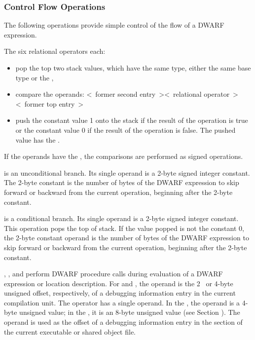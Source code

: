 \subsubsection{Control Flow Operations}
\label{chap:controlflowoperations}
The 
following operations provide simple control of the flow of a DWARF expression.
\begin{enumerate}[1. ]
\itembfnl{\DWOPleTARG, \DWOPgeTARG, \DWOPeqTARG, \DWOPltTARG, \DWOPgtTARG, \DWOPneTARG}
The six relational operators each:
\begin{itemize}
\item pop the top two stack values, which have the same type,
either the same base type or the \generictype, 

\item compare the operands:
\linebreak
\textless~former second entry~\textgreater  \textless~relational operator~\textgreater \textless~former top entry~\textgreater

\item push the constant value 1 onto the stack 
if the result of the operation is true or the
constant value 0 if the result of the operation is false.
The pushed value has the \generictype.
\end{itemize}

If the operands have the \generictype, the comparisons  
are performed as signed operations.

\itembfnl{\DWOPskipTARG}
\DWOPskipNAME{} is an unconditional branch. Its single operand
is a 2-byte signed integer constant. The 2-byte constant is
the number of bytes of the DWARF expression to skip forward
or backward from the current operation, beginning after the
2-byte constant.

\itembfnl{\DWOPbraTARG}
\DWOPbraNAME{} is a conditional branch. Its single operand is a
2-byte signed integer constant.  This operation pops the
top of stack. If the value popped is not the constant 0,
the 2-byte constant operand is the number of bytes of the
DWARF expression to skip forward or backward from the current
operation, beginning after the 2-byte constant.

\itembfnl{\DWOPcalltwoTARG, \DWOPcallfourTARG, \DWOPcallrefTARG}
\DWOPcalltwoNAME, 
\DWOPcallfourNAME, 
and \DWOPcallrefNAME{} perform
DWARF procedure calls during evaluation of a DWARF expression or
location description. 
For \DWOPcalltwoNAME{} and \DWOPcallfourNAME{}, 
the operand is the 2\dash~ or 4-byte unsigned offset, respectively,
of a debugging information entry in the current compilation
unit. The \DWOPcallrefNAME{} operator has a single operand. In the
\thirtytwobitdwarfformat,
the operand is a 4-byte unsigned value;
in the \sixtyfourbitdwarfformat, it is an 8-byte unsigned value
(see Section 
\bb
{}). 
\eb
The operand is used as the offset of a
debugging information entry in
\bb
the \dotdebuginfo{} section of the current executable or shared object file.
\eb



\end{enumerate}
